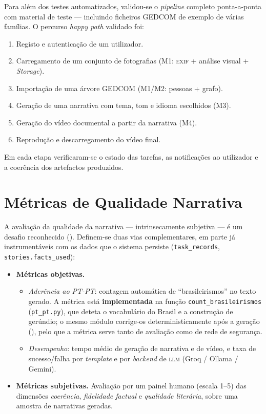 Para além dos testes automatizados, validou-se o \emph{pipeline} completo
ponta-a-ponta com material de teste — incluindo ficheiros GEDCOM de
exemplo de várias famílias. O percurso \emph{happy path} validado foi:

\begin{enumerate}[leftmargin=*]
  \item Registo e autenticação de um utilizador.
  \item Carregamento de um conjunto de fotografias (M1: \textsc{exif} +
  análise visual + \emph{Storage}).
  \item Importação de uma árvore GEDCOM (M1/M2: pessoas + grafo).
  \item Geração de uma narrativa com tema, tom e idioma escolhidos (M3).
  \item Geração do vídeo documental a partir da narrativa (M4).
  \item Reprodução e descarregamento do vídeo final.
\end{enumerate}

Em cada etapa verificaram-se o estado das tarefas, as notificações ao
utilizador e a coerência dos artefactos produzidos.

\section{Métricas de Qualidade Narrativa}
\label{sec:qualidade}

A avaliação da qualidade da narrativa — intrinsecamente subjetiva — é um
desafio reconhecido (). Definem-se duas vias
complementares, em parte já instrumentáveis com os dados que o sistema
persiste (\texttt{task\_records}, \texttt{stories.facts\_used}):

\begin{itemize}[leftmargin=*]
  \item \textbf{Métricas objetivas.}
  \begin{itemize}
    \item \emph{Aderência ao PT-PT}: contagem automática de
    ``brasileirismos'' no texto gerado. A métrica está \textbf{implementada}
    na função \texttt{count\_brasileirismos} (\texttt{pt\_pt.py}), que
    deteta o vocabulário do Brasil e a construção de gerúndio; o mesmo
    módulo corrige-os deterministicamente após a geração
    (), pelo que a métrica serve tanto de avaliação como
    de rede de segurança.
    \item \emph{Desempenho}: tempo médio de geração de narrativa e de
    vídeo, e taxa de sucesso/falha por \emph{template} e por \emph{backend}
    de \textsc{llm} (Groq / Ollama / Gemini).
  \end{itemize}
  \item \textbf{Métricas subjetivas.} Avaliação por um painel humano
  (escala 1--5) das dimensões \emph{coerência}, \emph{fidelidade factual}
  e \emph{qualidade literária}, sobre uma amostra de narrativas geradas.
\end{itemize}

